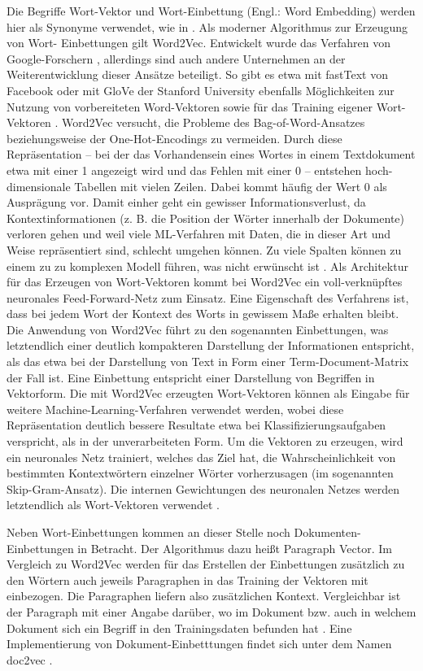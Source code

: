 Die Begriffe Wort-Vektor und Wort-Einbettung (Engl.: Word Embedding) werden hier als Synonyme verwendet, wie in \cite[S. 38]{White}. Als moderner Algorithmus zur Erzeugung von Wort- Einbettungen gilt Word2Vec. Entwickelt wurde das Verfahren von Google-Forschern \cite{mikolov2013}, allerdings sind auch andere Unternehmen an der Weiterentwicklung dieser Ansätze beteiligt. So gibt es etwa mit fastText von Facebook oder mit GloVe der Stanford University ebenfalls Möglichkeiten zur Nutzung von vorbereiteten Word-Vektoren sowie für das Training eigener Wort-Vektoren \cite{facebook} \cite{stanford}. Word2Vec versucht, die Probleme des Bag-of-Word-Ansatzes beziehungsweise der One-Hot-Encodings zu vermeiden. Durch diese Repräsentation – bei der das Vorhandensein eines Wortes in einem Textdokument etwa mit einer 1 angezeigt wird und das Fehlen mit einer 0 – entstehen hoch-dimensionale Tabellen mit vielen Zeilen. Dabei kommt häufig der Wert 0 als Ausprägung vor. Damit einher geht ein gewisser Informationsverlust, da Kontextinformationen (z. B. die Position der Wörter innerhalb der Dokumente) verloren gehen  und weil viele ML-Verfahren mit Daten, die in dieser Art und Weise repräsentiert sind, schlecht umgehen können. Zu viele Spalten können zu einem zu zu komplexen Modell führen, was nicht erwünscht ist \cite[S. 145]{knime}. Als Architektur für das Erzeugen von Wort-Vektoren kommt bei Word2Vec ein voll-verknüpftes neuronales Feed-Forward-Netz zum Einsatz. Eine Eigenschaft des Verfahrens ist, dass bei jedem Wort der Kontext des Worts in gewissem Maße erhalten bleibt. Die Anwendung von Word2Vec führt zu den sogenannten Einbettungen, was letztendlich einer deutlich kompakteren Darstellung der Informationen entspricht, als das etwa bei der Darstellung von Text in Form einer Term-Document-Matrix der Fall ist. Eine Einbettung entspricht einer Darstellung von Begriffen in Vektorform. Die mit Word2Vec erzeugten Wort-Vektoren können als Eingabe für weitere Machine-Learning-Verfahren verwendet werden, wobei diese Repräsentation deutlich bessere Resultate etwa bei Klassifizierungsaufgaben verspricht, als in der unverarbeiteten Form. Um die Vektoren zu erzeugen, wird ein neuronales Netz trainiert, welches das Ziel hat, die Wahrscheinlichkeit von bestimmten Kontextwörtern einzelner Wörter vorherzusagen (im sogenannten Skip-Gram-Ansatz). Die internen Gewichtungen des neuronalen Netzes werden letztendlich als Wort-Vektoren verwendet \cite[S. 148-160]{knime}. 

Neben Wort-Einbettungen kommen an dieser Stelle noch Dokumenten-Einbettungen in Betracht. Der Algorithmus dazu heißt Paragraph Vector. Im Vergleich zu Word2Vec werden für das Erstellen der Einbettungen zusätzlich zu den Wörtern auch jeweils Paragraphen in das Training der Vektoren mit einbezogen. Die Paragraphen liefern also zusätzlichen Kontext. Vergleichbar ist der Paragraph mit einer Angabe darüber, wo im Dokument bzw. auch in welchem Dokument sich ein Begriff in den Trainingsdaten befunden hat \cite{mikolov2014}. Eine Implementierung von Dokument-Einbetttungen findet sich unter dem Namen doc2vec \cite{rehurek}.

